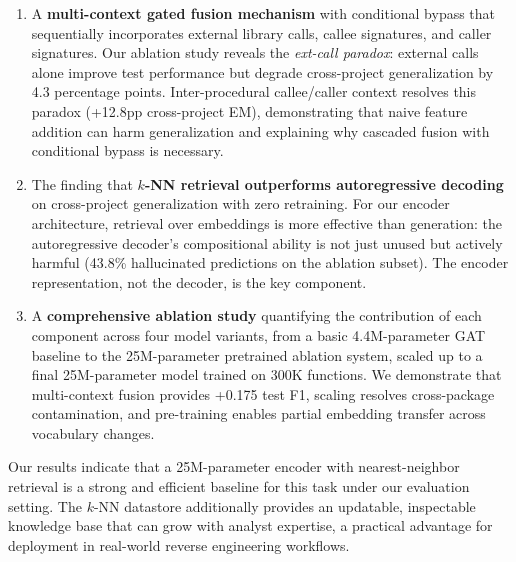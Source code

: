 \documentclass[sigconf,nonacm]{acmart}
\begin{document}
\begin{enumerate}
    \item A \textbf{multi-context gated fusion mechanism} with conditional bypass that sequentially incorporates external library calls, callee signatures, and caller signatures. Our ablation study reveals the \emph{ext-call paradox}: external calls alone improve test performance but degrade cross-project generalization by 4.3 percentage points. Inter-procedural callee/caller context resolves this paradox (+12.8pp cross-project EM), demonstrating that naive feature addition can harm generalization and explaining why cascaded fusion with conditional bypass is necessary.

    \item The finding that \textbf{$k$-NN retrieval outperforms autoregressive decoding} on cross-project generalization with zero retraining. For our encoder architecture, retrieval over embeddings is more effective than generation: the autoregressive decoder's compositional ability is not just unused but actively harmful (43.8\% hallucinated predictions on the ablation subset). The encoder representation, not the decoder, is the key component.

    \item A \textbf{comprehensive ablation study} quantifying the contribution of each component across four model variants, from a basic 4.4M-parameter GAT baseline to the 25M-parameter pretrained ablation system, scaled up to a final 25M-parameter model trained on 300K functions. We demonstrate that multi-context fusion provides +0.175 test F1, scaling resolves cross-package contamination, and pre-training enables partial embedding transfer across vocabulary changes.
\end{enumerate}

Our results indicate that a 25M-parameter encoder with nearest-neighbor retrieval is a strong and efficient baseline for this task under our evaluation setting. The $k$-NN datastore additionally provides an updatable, inspectable knowledge base that can grow with analyst expertise, a practical advantage for deployment in real-world reverse engineering workflows.

\end{document}
